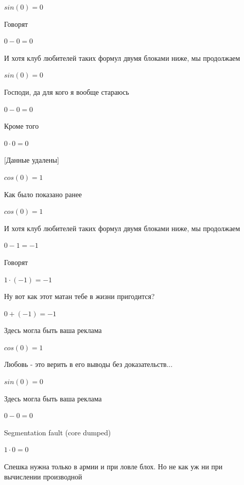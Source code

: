 \documentclass[12pt,a4paper,fleqn]{article}
\begin{document}
\begin{center}$sin(0) = 0$\end{center}
Говорят

\begin{center}$0-0 = 0$\end{center}
И хотя клуб любителей таких формул двумя блоками ниже, мы продолжаем

\begin{center}$sin(0) = 0$\end{center}
Господи, да для кого я вообще стараюсь

\begin{center}$0-0 = 0$\end{center}
Кроме того

\begin{center}$0 \cdot 0 = 0$\end{center}
[Данные удалены]

\begin{center}$cos(0) = 1$\end{center}
Как было показано ранее

\begin{center}$cos(0) = 1$\end{center}
И хотя клуб любителей таких формул двумя блоками ниже, мы продолжаем

\begin{center}$0-1 = -1$\end{center}
Говорят

\begin{center}$1 \cdot (-1) = -1$\end{center}
Ну вот как этот матан тебе в жизни пригодится?

\begin{center}$0+(-1) = -1$\end{center}
Здесь могла быть ваша реклама

\begin{center}$cos(0) = 1$\end{center}
Любовь - это верить в его выводы без доказательств...

\begin{center}$sin(0) = 0$\end{center}
Здесь могла быть ваша реклама

\begin{center}$0-0 = 0$\end{center}
Segmentation fault (core dumped)

\begin{center}$1 \cdot 0 = 0$\end{center}
Спешка нужна только в армии и при ловле блох. Но не как уж ни при вычислении производной\cite{link2}
\end{document}
